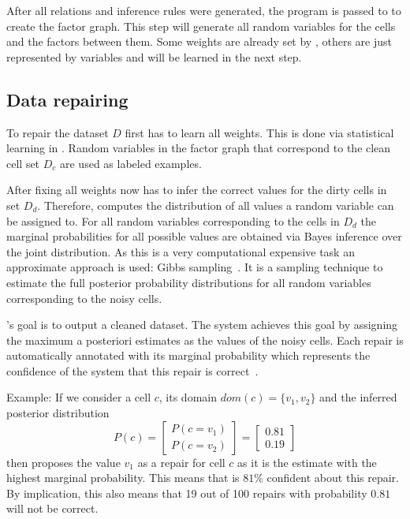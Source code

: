   \bigskip
  After all relations and inference rules were generated, the \ddlog{} program is passed to \deepdive{} to create the factor graph.
  This step will generate all random variables for the cells and the factors between them.
  Some weights are already set by \holoclean{}, others are just represented by variables and will be learned in the next step.
  
  \subsection{Data repairing}\label{sec:repairing}
  To repair the dataset $D$ \holoclean{} first has to learn all weights.
  This is done via statistical learning in \deepdive{}.
  Random variables in the factor graph that correspond to the clean cell set $D_c$ are used as labeled examples.
  
  After fixing all weights \holoclean{} now has to infer the correct values for the dirty cells in set $D_d$.
  Therefore, \holoclean{} computes the distribution of all values a random variable can be assigned to.
  For all random variables corresponding to the cells in $D_d$ the marginal probabilities for all possible values are obtained via Bayes inference over the joint distribution.
  As this is a very computational expensive task an approximate approach is used: Gibbs sampling~\cite{gibbssampling}.
  It is a sampling technique to estimate the full posterior probability distributions for all random variables corresponding to the noisy cells.
  
  \holoclean{}'s goal is to output a cleaned dataset.
  The system achieves this goal by assigning the maximum a posteriori estimates as the values of the noisy cells.
  Each repair is automatically annotated with its marginal probability which represents the confidence of the system that this repair is correct~\cite{holoclean}. 
  
  Example: If we consider a cell $c$, its domain $dom(c)=\{v_1, v_2\}$ and the inferred posterior distribution
  \begin{equation}
    P(c) =
    \begin{bmatrix}
      P(c = v_1)\\
      P(c = v_2)
    \end{bmatrix} = 
    \begin{bmatrix}
      0.81\\
      0.19
    \end{bmatrix}
  \end{equation}
  then \holoclean{} proposes the value $v_1$ as a repair for cell $c$ as it is the estimate with the highest marginal probability.
  This means that \holoclean{} is $81\%$ confident about this repair.
  By implication, this also means that 19 out of 100 repairs with probability $0.81$ will not be correct.

